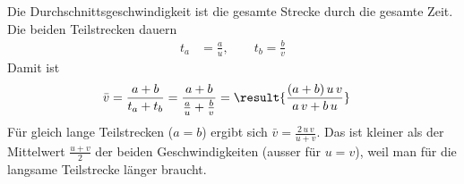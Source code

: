 Die Durchschnittsgeschwindigkeit ist die gesamte Strecke durch die gesamte Zeit. Die beiden Teilstrecken dauern
\begin{align}
 t_a &= \frac{a}{u}, \qquad t_b = \frac{b}{v}
\end{align}
Damit ist
\begin{align}
 \bar v &= \frac{a+b}{t_a+t_b} = \frac{a+b}{\frac{a}{u}+\frac{b}{v}} = \result{\frac{(a+b)\,u\,v}{a\,v+b\,u}}
\end{align}
Für gleich lange Teilstrecken ($a=b$) ergibt sich $\bar v = \frac{2\,u\,v}{u+v}$. Das ist kleiner als der Mittelwert $\frac{u+v}{2}$ der beiden Geschwindigkeiten (ausser für $u=v$), weil man für die langsame Teilstrecke länger braucht.
